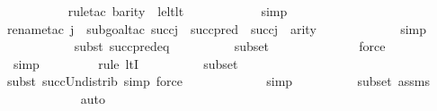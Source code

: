 \begin{isabellebody}
\ \ \ \ \ \ \ \ \ \isamarkupfalse%
{\isacharparenleft}{\kern0pt}rule{\isacharunderscore}{\kern0pt}tac\ b{\isacharequal}{\kern0pt}{\isachardoublequoteopen}arity{\isacharparenleft}{\kern0pt}{\isasymphi}{\isacharparenright}{\kern0pt}{\isachardoublequoteclose}\ \ le{\isacharunderscore}{\kern0pt}lt{\isacharunderscore}{\kern0pt}lt{\isacharparenright}{\kern0pt}\isanewline
\ \ \ \ \ \ \ \ \ \ \isamarkupfalse%
\ simp\isanewline
\ \ \ \ \ \ \ \ \ \ \isamarkupfalse%
{\isacharparenleft}{\kern0pt}rename{\isacharunderscore}{\kern0pt}tac\ j\ {\isasympsi}{\isacharcomma}{\kern0pt}\ subgoal{\isacharunderscore}{\kern0pt}tac\ {\isachardoublequoteopen}succ{\isacharparenleft}{\kern0pt}j{\isacharparenright}{\kern0pt}\ {\isasymle}\ succ{\isacharparenleft}{\kern0pt}pred{\isacharparenleft}{\kern0pt}{}\ {\isasymunion}\ succ{\isacharparenleft}{\kern0pt}j{\isacharparenright}{\kern0pt}\ {\isasymunion}\ arity{\isacharparenleft}{\kern0pt}{\isasympsi}{\isacharparenright}{\kern0pt}{\isacharparenright}{\kern0pt}{\isacharparenright}{\kern0pt}{\isachardoublequoteclose}{\isacharparenright}{\kern0pt}\isanewline
\ \ \ \ \ \ \ \ \ \ \ \isamarkupfalse%
\ simp\isanewline
\ \ \ \ \ \ \ \ \ \ \isamarkupfalse%
{\isacharparenleft}{\kern0pt}subst\ succ{\isacharunderscore}{\kern0pt}pred{\isacharunderscore}{\kern0pt}eq{\isacharparenright}{\kern0pt}\isanewline
\ \ \ \ \ \ \ \ \isamarkupfalse%
\ {\isasymDelta}{}{\isacharunderscore}{\kern0pt}subset\isanewline
\ \ \ \ \ \ \ \ \ \ \ \ \isamarkupfalse%
\ force\isanewline
\ \ \ \ \ \ \ \ \ \ \ \isamarkupfalse%
\ simp\isanewline
\ \ \ \ \ \ \ \ \isamarkupfalse%
{\isacharparenleft}{\kern0pt}rule\ ltI{\isacharparenright}{\kern0pt}\isanewline
\ \ \ \ \ \ \ \ \isamarkupfalse%
\ {\isasymDelta}{}{\isacharunderscore}{\kern0pt}subset\isanewline
\ \ \ \ \ \ \ \ \ \ \ \isamarkupfalse%
{\isacharparenleft}{\kern0pt}subst\ succ{\isacharunderscore}{\kern0pt}Un{\isacharunderscore}{\kern0pt}distrib{\isacharcomma}{\kern0pt}\ simp{\isacharcomma}{\kern0pt}\ force{\isacharparenright}{\kern0pt}{\isacharplus}{\kern0pt}\isanewline
\ \ \ \ \ \ \ \ \ \ \ \isamarkupfalse%
\ simp\isanewline
\ \ \ \ \ \ \ \ \isamarkupfalse%
\ {\isasymDelta}{}{\isacharunderscore}{\kern0pt}subset\ assms{}\isanewline
\ \ \ \ \ \ \ \ \ \ \isamarkupfalse%
\ auto{\isacharbrackleft}{\kern0pt}{}{\isacharbrackright}{\kern0pt}\isanewline

\end{isabellebody}

